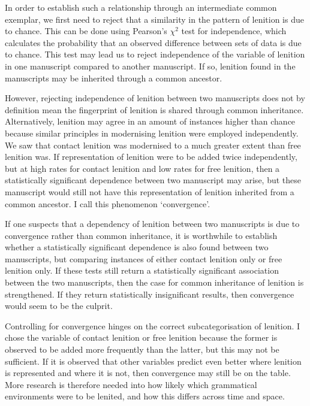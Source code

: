 In order to establish such a relationship through an intermediate common exemplar, we first need to reject that a similarity in the pattern of lenition is due to chance. This can be done using Pearson's \(\chi^2\) test for independence, which calculates the probability that an observed difference between sets of data is due to chance. This test may lead us to reject independence of the variable of lenition in one manuscript compared to another manuscript. If so, lenition found in the manuscripts may be inherited through a common ancestor.

However, rejecting independence of lenition between two manuscripts does not by definition mean the fingerprint of lenition is shared through common inheritance. Alternatively, lenition may agree in an amount of instances higher than chance because similar principles in modernising lenition were employed independently. We saw that contact lenition was modernised to a much greater extent than free lenition was. If representation of lenition were to be added twice independently, but at high rates for contact lenition and low rates for free lenition, then a statistically significant dependence between two manuscript may arise, but these manuscript would still not have this representation of lenition inherited from a common ancestor. I call this phenomenon `convergence'.

If one suspects that a dependency of lenition between two manuscripts is due to convergence rather than common inheritance, it is worthwhile to establish whether a statistically significant dependence is also found between two manuscripts, but comparing instances of either contact lenition only or free lenition only. If these tests still return a statistically significant association between the two manuscripts, then the case for common inheritance of lenition is strengthened. If they return statistically insignificant results, then convergence would seem to be the culprit.

Controlling for convergence hinges on the correct subcategorisation of lenition. I chose the variable of contact lenition or free lenition because the former is observed to be added more frequently than the latter, but this may not be sufficient. If it is observed that other variables predict even better where lenition is represented and where it is not, then convergence may still be on the table. More research is therefore needed into how likely which grammatical environments were to be lenited, and how this differs across time and space.

